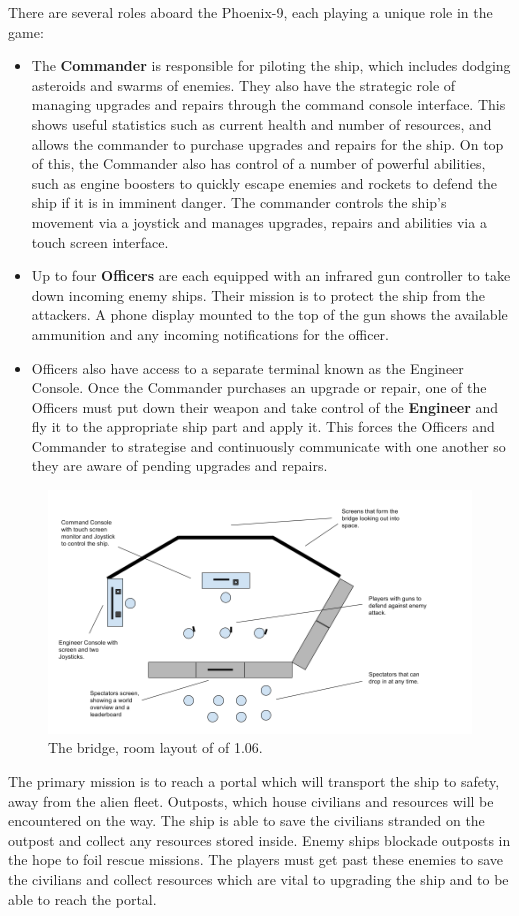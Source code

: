 \documentclass[a4paper,11pt]{article}
\begin{document}
There are several roles aboard the Phoenix-9, each playing a unique role in the game:

\begin{itemize}[noitemsep,topsep=.5ex]
  \item The \textbf{Commander} is responsible for piloting the ship, which includes dodging asteroids and swarms of enemies. They also have the strategic role of managing upgrades and repairs through the command console interface. This shows useful statistics such as current health and number of resources, and allows the commander to purchase upgrades and repairs for the ship. On top of this, the Commander also has control of a number of powerful abilities, such as engine boosters to quickly escape enemies and rockets to defend the ship if it is in imminent danger. 
  The commander controls the ship's movement via a joystick and manages upgrades, repairs and abilities via a touch screen interface. 

  \item Up to four \textbf{Officers} are each equipped with an infrared gun controller to take down incoming enemy ships. Their mission is to protect the ship from the attackers. A phone display mounted to the top of the gun shows the available ammunition and any incoming notifications for the officer.

  \item Officers also have access to a separate terminal known as the Engineer Console. Once the Commander purchases an upgrade or repair, one of the Officers must put down their weapon and take control of the \textbf{Engineer} and fly it to the appropriate ship part and apply it. This forces the Officers and Commander to strategise and continuously communicate with one another so they are aware of pending upgrades and repairs.
\end{itemize}

\begin{figure}[h!]
	\centering
    \includegraphics[width=0.\textwidth]{images/roomCropped}
    \caption{The bridge, room layout of of 1.06.}
    \label{fig:room_layout}
\end{figure}

The primary mission is to reach a portal which will transport the ship to safety, away from the alien fleet. Outposts, which house civilians and resources will be encountered on the way. The ship is able to save the civilians stranded on the outpost and collect any resources stored inside. Enemy ships blockade outposts in the hope to foil rescue missions. The players must get past these enemies to save the civilians and collect resources which are vital to upgrading the ship and to be able to reach the portal. 
\end{document}
